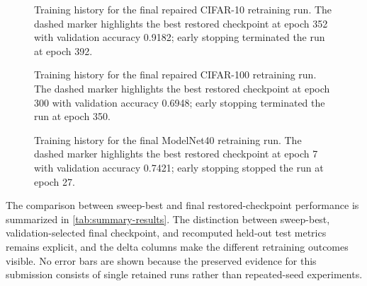 \begin{figure}[t]
  \centering
  
  \caption{Training history for the final repaired CIFAR-10 retraining run. The dashed marker highlights the best restored checkpoint at epoch 352 with validation accuracy 0.9182; early stopping terminated the run at epoch 392.}
  \label{fig:cifar10-training}
\end{figure}

\begin{figure}[t]
  \centering
  
  \caption{Training history for the final repaired CIFAR-100 retraining run. The dashed marker highlights the best restored checkpoint at epoch 300 with validation accuracy 0.6948; early stopping terminated the run at epoch 350.}
  \label{fig:cifar100-training}
\end{figure}

\begin{figure}[t]
  \centering
  
  \caption{Training history for the final ModelNet40 retraining run. The dashed marker highlights the best restored checkpoint at epoch 7 with validation accuracy 0.7421; early stopping stopped the run at epoch 27.}
  \label{fig:modelnet-training}
\end{figure}

\clearpage

The comparison between sweep-best and final restored-checkpoint performance is summarized in \autoref{tab:summary-results}. The distinction between sweep-best, validation-selected final checkpoint, and recomputed held-out test metrics remains explicit, and the delta columns make the different retraining outcomes visible. No error bars are shown because the preserved evidence for this submission consists of single retained runs rather than repeated-seed experiments.

